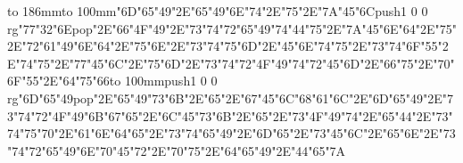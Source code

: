 \hbox to 186mm{\hsize=81mm\vbox to 100mm{\vfill\ipa\char"6D\ipa\char"65\ipa\char"49\ipa\char"2E\ipa\char"65\ipa\char"49\ipa\char"6E\ipa\char"74\ipa\char"2E\ipa\char"75\ipa\char"2E\ipa\char"7A\ipa\char"45\ipa\char"6C\medskip\pdfcolorstack\match push{1 0 0 rg}\ipa\char"77\ipa\char"32\ipa\char"6E\pdfcolorstack\match pop{}\ipa\char"2E\ipa\char"66\ipa\char"4F\ipa\char"49\ipa\char"2E\ipa\char"73\ipa\char"74\ipa\char"72\ipa\char"65\ipa\char"49\ipa\char"74\medskip\ipa\char"44\ipa\char"75\ipa\char"2E\ipa\char"7A\ipa\char"45\ipa\char"6E\ipa\char"64\ipa\char"2E\ipa\char"75\ipa\char"2E\ipa\char"72\ipa\char"61\ipa\char"49\ipa\char"6E\ipa\char"64\ipa\char"2E\ipa\char"75\ipa\char"6E\ipa\char"2E\ipa\char"73\ipa\char"74\ipa\char"75\ipa\char"6D\ipa\char"2E\ipa\char"45\ipa\char"6E\ipa\char"74\medskip\ipa\char"75\ipa\char"2E\ipa\char"73\ipa\char"74\ipa\char"6F\ipa\char"55\ipa\char"2E\ipa\char"74\ipa\char"75\ipa\char"2E\ipa\char"77\ipa\char"45\ipa\char"6C\ipa\char"2E\ipa\char"75\ipa\char"6D\ipa\char"2E\ipa\char"73\ipa\char"74\ipa\char"72\ipa\char"4F\ipa\char"49\ipa\char"74\medskip\ipa\char"72\ipa\char"45\ipa\char"6D\ipa\char"2E\ipa\char"66\ipa\char"75\ipa\char"2E\ipa\char"70\ipa\char"6F\ipa\char"55\ipa\char"2E\ipa\char"64\ipa\char"75\ipa\char"66\vfill}\hfill\vbox to 100mm{\vfill\pdfcolorstack\match push{1 0 0 rg}\ipa\char"6D\ipa\char"65\ipa\char"49\pdfcolorstack\match pop{}\ipa\char"2E\ipa\char"65\ipa\char"49\ipa\char"73\ipa\char"6B\ipa\char"2E\ipa\char"65\ipa\char"2E\ipa\char"67\ipa\char"45\ipa\char"6C\medskip\ipa\char"68\ipa\char"61\ipa\char"6C\ipa\char"2E\ipa\char"6D\ipa\char"65\ipa\char"49\ipa\char"2E\ipa\char"73\ipa\char"74\ipa\char"72\ipa\char"4F\ipa\char"49\ipa\char"6B\medskip\ipa\char"67\ipa\char"65\ipa\char"2E\ipa\char"6C\ipa\char"45\ipa\char"73\ipa\char"6B\ipa\char"2E\ipa\char"65\ipa\char"2E\ipa\char"73\ipa\char"4F\ipa\char"49\ipa\char"74\ipa\char"2E\ipa\char"65\ipa\char"44\ipa\char"2E\ipa\char"73\ipa\char"74\ipa\char"75\ipa\char"70\ipa\char"2E\ipa\char"61\ipa\char"6E\ipa\char"64\medskip\ipa\char"65\ipa\char"2E\ipa\char"73\ipa\char"74\ipa\char"65\ipa\char"49\ipa\char"2E\ipa\char"6D\ipa\char"65\ipa\char"2E\ipa\char"73\ipa\char"45\ipa\char"6C\ipa\char"2E\ipa\char"65\ipa\char"6E\ipa\char"2E\ipa\char"73\ipa\char"74\ipa\char"72\ipa\char"65\ipa\char"49\ipa\char"6E\medskip\ipa\char"70\ipa\char"45\ipa\char"72\ipa\char"2E\ipa\char"70\ipa\char"75\ipa\char"2E\ipa\char"64\ipa\char"65\ipa\char"49\ipa\char"2E\ipa\char"44\ipa\char"65\ipa\char"7A\vfill}}\eject
